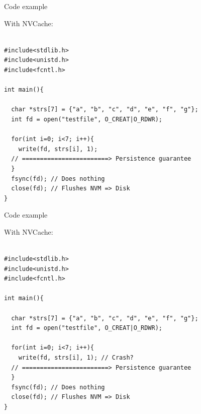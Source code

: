 \documentclass[presentation]{beamer}
\begin{document}
\begin{frame}[label={sec:org55bf938},fragile]{Code example}
 \begin{block}{With NVCache:}
\fontsize{8pt}{10pt}\\
\begin{verbatim}

#include<stdlib.h>
#include<unistd.h>
#include<fcntl.h>

int main(){

  char *strs[7] = {"a", "b", "c", "d", "e", "f", "g"};
  int fd = open("testfile", O_CREAT|O_RDWR);

  for(int i=0; i<7; i++){
    write(fd, strs[i], 1);
  // ========================> Persistence guarantee
  }
  fsync(fd); // Does nothing
  close(fd); // Flushes NVM => Disk
}

\end{verbatim}
\end{block}
\end{frame}

\begin{frame}[label={sec:org90b9e4a},fragile]{Code example}
 \begin{block}{With NVCache:}
\fontsize{8pt}{10pt}\\
\begin{verbatim}

#include<stdlib.h>
#include<unistd.h>
#include<fcntl.h>

int main(){

  char *strs[7] = {"a", "b", "c", "d", "e", "f", "g"};
  int fd = open("testfile", O_CREAT|O_RDWR);

  for(int i=0; i<7; i++){
    write(fd, strs[i], 1); // Crash?
  // ========================> Persistence guarantee
  }
  fsync(fd); // Does nothing
  close(fd); // Flushes NVM => Disk
}

\end{verbatim}
\end{block}
\end{frame}
\end{document}
